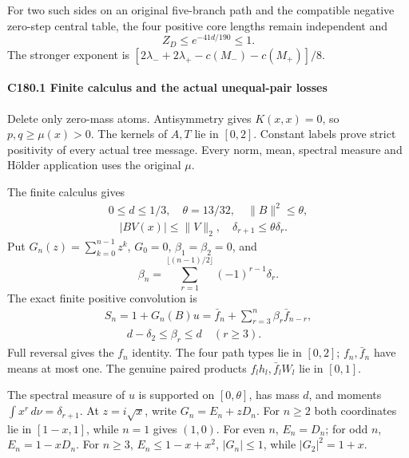 For two such sides on an original five-branch path and the compatible negative zero-step central table, the four positive core lengths remain independent and
\[
 \boxed{Z_D\le e^{-41d/190}\le1.}                     \tag{C180.6}
\]
The stronger exponent is \([2\lambda_-+2\lambda_+-c(M_-)-c(M_+)]/8\).

\paragraph{C180.1 Finite calculus and the actual unequal-pair losses}

Delete only zero-mass atoms. Antisymmetry gives \(K(x,\allowbreak \allowbreak  x)=0\), so \(p,\allowbreak \allowbreak  q\ge\mu(x)>0\). The kernels of \(A,\allowbreak \allowbreak  T\) lie in \([0,\allowbreak \allowbreak  2]\). Constant labels prove strict positivity of every actual tree message. Every norm, mean, spectral measure and Hölder application uses the original \(\mu\).

The finite calculus gives
\[
\begin{gathered}
0\le d\le1/3,\quad\theta=13/32,\quad\|B\|^2\le\theta,\\
\quad |BV(x)|\le\|V\|_2,\quad \delta_{r+1}\le\theta \delta_r.
\end{gathered}
\]
Put \(G_n(z)=\sum_{k=0}^{n-1}z^k\), \(G_0=0\), \(\beta_1=\beta_2=0\), and
\[
 \beta_n=\sum_{r=1}^{\lfloor(n-1)/2\rfloor}(-1)^{r-1}\delta_r.
\]
The exact finite positive convolution is
\[
\begin{gathered}
S_n=1+G_n(B)u=\bar f_n+\sum_{r=3}^n\beta_r \bar f_{n-r},\\
\qquad d-\delta_2\le\beta_r\le d\quad(r\ge3).
\end{gathered}\tag{C180.7}
\]
Full reversal gives the \(f_n\) identity. The four path types lie in \([0,\allowbreak \allowbreak  2]\); \(f_n,\allowbreak \allowbreak  \bar f_n\) have means at most one. The genuine paired products \(f_lh_l,\allowbreak \allowbreak  \bar f_lW_l\) lie in \([0,\allowbreak \allowbreak  1]\).

The spectral measure of \(u\) is supported on \([0,\allowbreak \allowbreak  \theta]\), has mass \(d\), and moments \(\int x^r\,\allowbreak \allowbreak  d\nu=\delta_{r+1}\). At \(z=i\sqrt x\), write \(G_n=E_n+zD_n\). For \(n\ge2\) both coordinates lie in \([1-x,\allowbreak \allowbreak  1]\), while \(n=1\) gives \((1,\allowbreak \allowbreak  0)\). For even \(n\), \(E_n=D_n\); for odd \(n\), \(E_n=1-xD_n\). For \(n\ge3\), \(E_n\le1-x+x^2\), \(|G_n|\le1\), while \(|G_2|^2=1+x\).

